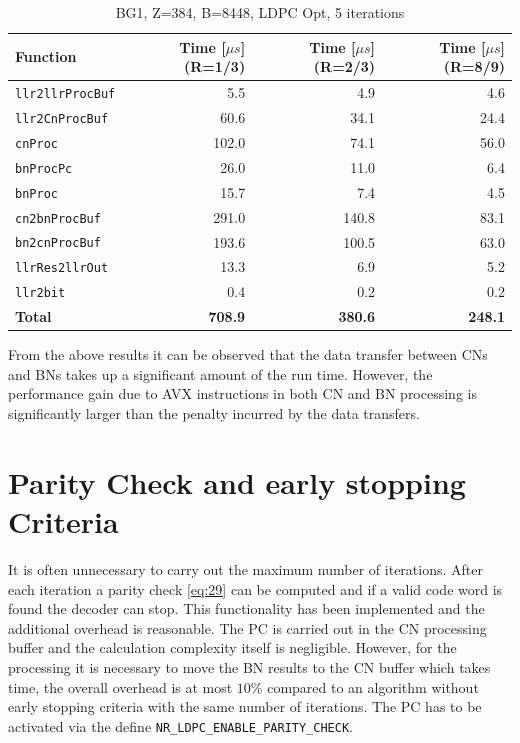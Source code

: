 \documentclass{article}
\begin{document}
\begin{table}[ht]
  \centering
  \begin{tabular}{lrrr}
    \toprule
    \textbf{Function} &  \textbf{Time [$\mu s$] (R=1/3)} & \textbf{Time [$\mu s$] (R=2/3)} & \textbf{Time [$\mu s$] (R=8/9)}\\
    \midrule
    \texttt{llr2llrProcBuf}  & 5.5   & 4.9   & 4.6  \\
    \texttt{llr2CnProcBuf}   & 60.6  & 34.1  & 24.4 \\
    \texttt{cnProc}          & 102.0 & 74.1  & 56.0 \\
    \texttt{bnProcPc}        & 26.0  & 11.0  & 6.4  \\
    \texttt{bnProc}          & 15.7  & 7.4   & 4.5  \\
    \texttt{cn2bnProcBuf}    & 291.0 & 140.8 & 83.1 \\
    \texttt{bn2cnProcBuf}    & 193.6 & 100.5 & 63.0 \\
    \texttt{llrRes2llrOut}   & 13.3  & 6.9   & 5.2  \\
    \texttt{llr2bit}         & 0.4   & 0.2   & 0.2  \\
    \midrule
    \textbf{Total}           & \textbf{708.9} & \textbf{380.6} & \textbf{248.1}\\
    \bottomrule
  \end{tabular}
  \caption{BG1, Z=384, B=8448, LDPC Opt, 5 iterations}
  \label{tab:lat-bg1-i5}
\end{table}

From the above results it can be observed that the data transfer between CNs and BNs takes up a significant amount of the run time. However, the performance gain due to AVX instructions in both CN and BN processing is significantly larger than the penalty incurred by the data transfers.

\section{Parity Check and early stopping Criteria}
It is often unnecessary to carry out the maximum number of iterations. After each iteration a parity check \eqref{eq:29} can be computed and if a valid code word is found the decoder can stop. This functionality has been implemented and the additional overhead is reasonable. The PC is carried out in the CN processing buffer and the calculation complexity itself is negligible. However, for the processing it is necessary to move the BN results to the CN buffer which takes time, the overall overhead is at most $10\%$ compared to an algorithm without early stopping criteria with the same number of iterations. The PC has to be activated via the define \texttt{NR\_LDPC\_ENABLE\_PARITY\_CHECK}.
\end{document}
